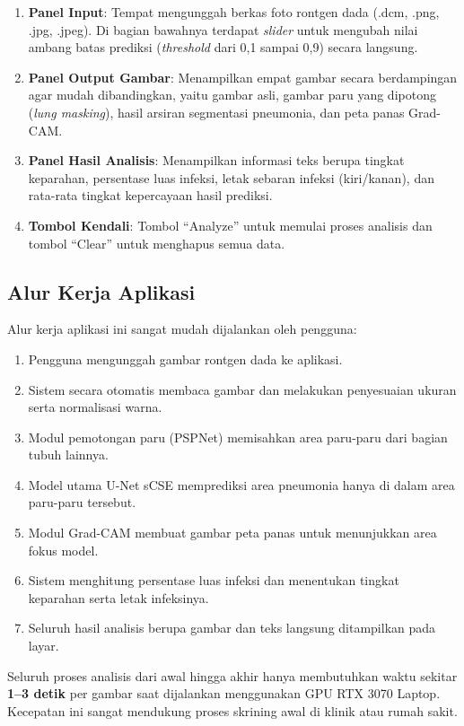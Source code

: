 \documentclass[12pt,a4paper,oneside]{book}
\begin{document}
\begin{enumerate}
  \item \textbf{Panel Input}: Tempat mengunggah berkas foto rontgen dada (.dcm, .png, .jpg, .jpeg). Di bagian bawahnya terdapat \textit{slider} untuk mengubah nilai ambang batas prediksi (\textit{threshold} dari 0,1 sampai 0,9) secara langsung.
  \item \textbf{Panel Output Gambar}: Menampilkan empat gambar secara berdampingan agar mudah dibandingkan, yaitu gambar asli, gambar paru yang dipotong (\textit{lung masking}), hasil arsiran segmentasi pneumonia, dan peta panas Grad-CAM.
  \item \textbf{Panel Hasil Analisis}: Menampilkan informasi teks berupa tingkat keparahan, persentase luas infeksi, letak sebaran infeksi (kiri/kanan), dan rata-rata tingkat kepercayaan hasil prediksi.
  \item \textbf{Tombol Kendali}: Tombol ``Analyze'' untuk memulai proses analisis dan tombol ``Clear'' untuk menghapus semua data.
\end{enumerate}

\subsection{Alur Kerja Aplikasi}

Alur kerja aplikasi ini sangat mudah dijalankan oleh pengguna:
\begin{enumerate}
  \item Pengguna mengunggah gambar rontgen dada ke aplikasi.
  \item Sistem secara otomatis membaca gambar dan melakukan penyesuaian ukuran serta normalisasi warna.
  \item Modul pemotongan paru (PSPNet) memisahkan area paru-paru dari bagian tubuh lainnya.
  \item Model utama U-Net sCSE memprediksi area pneumonia hanya di dalam area paru-paru tersebut.
  \item Modul Grad-CAM membuat gambar peta panas untuk menunjukkan area fokus model.
  \item Sistem menghitung persentase luas infeksi dan menentukan tingkat keparahan serta letak infeksinya.
  \item Seluruh hasil analisis berupa gambar dan teks langsung ditampilkan pada layar.
\end{enumerate}

Seluruh proses analisis dari awal hingga akhir hanya membutuhkan waktu sekitar \textbf{1--3 detik} per gambar saat dijalankan menggunakan GPU RTX 3070 Laptop. Kecepatan ini sangat mendukung proses skrining awal di klinik atau rumah sakit.
\end{document}
